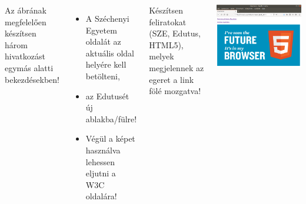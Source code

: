 \begin{frame}
  \begin{columns}[c]
      Az ábrának megfelelően készítsen három hivatkozást egymás alatti bekezdésekben!
      \begin{itemize}
        \item A Széchenyi Egyetem oldalát az aktuális oldal helyére kell betölteni,
        \item az Edutusét új ablakba/fülre! 
        \item Végül a  képet használva lehessen eljutni a W3C oldalára!
      \end{itemize}
      Készítsen feliratokat (SZE, Edutus, HTML5), melyek megjelennek az egeret a link fölé mozgatva!
      \begin{center}
        \begin{exampleblock}{}
          \centering \includegraphics[scale=.2]{hivatkozas.png}
        \end{exampleblock}
      \end{center}
  \end{columns}
\end{frame}

